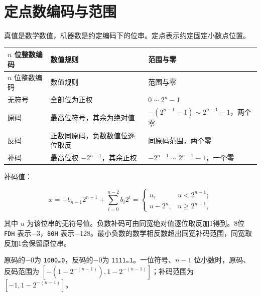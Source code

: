 \section{定点数编码与范围}\label{CO02-fixed}

真值是数学数值，机器数是约定编码下的位串。定点表示约定固定小数点位置。

\par\smallskip
{\fontsize{9.3}{12}\selectfont\setlength{\tabcolsep}{2.5pt}\setlength{\LTleft}{0pt}\setlength{\LTright}{0pt}
\begin{longtable}{@{}>{\raggedright\arraybackslash}p{}>{\raggedright\arraybackslash}p{}>{\raggedright\arraybackslash}p{}@{}}
\toprule
\(n\) 位整数编码 & 数值规则 & 范围与零 \\

\midrule\endfirsthead\toprule
\(n\) 位整数编码 & 数值规则 & 范围与零 \\

\midrule\endhead\bottomrule\endfoot
无符号 & 全部位为正权 & \(0\sim2^n-1\) \\

原码 & 最高位符号，其余为绝对值 & \(-(2^{n-1}-1)\sim2^{n-1}-1\)，两个零 \\

反码 & 正数同原码，负数数值位逐位取反 & 同原码范围，两个零 \\

补码 & 最高位权 \(-2^{n-1}\)，其余正权 & \(-2^{n-1}\sim2^{n-1}-1\)，一个零 \\

\end{longtable}}
\par\smallskip

补码值：

\[x=-b_{n-1}2^{n-1}+\sum_{i=0}^{n-2}b_i2^i=\begin{cases}u,&u<2^{n-1};\\u-2^n,&u\ge2^{n-1},\end{cases}\]

其中 \(u\) 为该位串的无符号值。负数补码可由同宽绝对值逐位取反加1得到。8位 \texttt{FDH} 表示\ensuremath{-}3，\texttt{80H} 表示\ensuremath{-}128。最小负数的数学相反数超出同宽补码范围，同宽取反加1会保留原位串。

原码的\ensuremath{-}0为 \texttt{1000…0}，反码的\ensuremath{-}0为 \texttt{1111…1}。一位符号、\(n-1\) 位小数时，原码、反码范围为 \([-(1-2^{-(n-1)}),1-2^{-(n-1)}]\)；补码范围为 \([-1,1-2^{-(n-1)}]\)。

